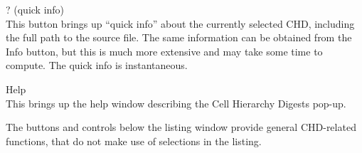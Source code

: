 \begin{description}
\item{\cb ?} (quick info)\\
This button brings up ``quick info'' about the currently selected CHD,
including the full path to the source file.  The same information can
be obtained from the {\cb Info} button, but this is much more
extensive and may take some time to compute.  The quick info is
instantaneous.

\item{\cb Help}\\
This brings up the help window describing the {\cb Cell Hierarchy
Digests} pop-up.
\end{description}

The buttons and controls below the listing window provide general
CHD-related functions, that do not make use of selections in the
listing.

